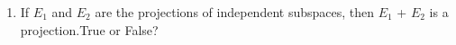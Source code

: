 \renewcommand{\theequation}{\theenumi}
\renewcommand{\thefigure}{\theenumi}
\begin{enumerate}[label=\thesubsection.\arabic*.,ref=\thesubsection.\theenumi]

\item %
If $E_1$ and $E_2$ are the projections of independent subspaces, then $E_1$ + $E_2$ is a projection.True or False?
%
\\
\solution

\end{enumerate}
